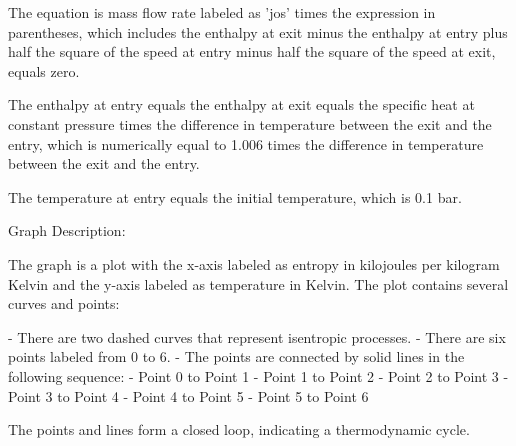 The equation is mass flow rate labeled as 'jos' times the expression in parentheses, which includes the enthalpy at exit minus the enthalpy at entry plus half the square of the speed at entry minus half the square of the speed at exit, equals zero.

The enthalpy at entry equals the enthalpy at exit equals the specific heat at constant pressure times the difference in temperature between the exit and the entry, which is numerically equal to 1.006 times the difference in temperature between the exit and the entry.

The temperature at entry equals the initial temperature, which is 0.1 bar.

Graph Description:

The graph is a plot with the x-axis labeled as entropy in kilojoules per kilogram Kelvin and the y-axis labeled as temperature in Kelvin. The plot contains several curves and points:

- There are two dashed curves that represent isentropic processes.
- There are six points labeled from 0 to 6.
- The points are connected by solid lines in the following sequence:
  - Point 0 to Point 1
  - Point 1 to Point 2
  - Point 2 to Point 3
  - Point 3 to Point 4
  - Point 4 to Point 5
  - Point 5 to Point 6

The points and lines form a closed loop, indicating a thermodynamic cycle.